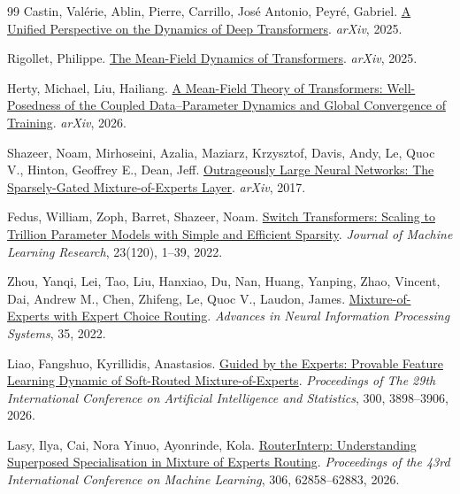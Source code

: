 \documentclass[11pt]{article}
\begin{document}
\begin{thebibliography}{99}
Castin, Val{\'e}rie, Ablin, Pierre, Carrillo, Jos{\'e} Antonio, Peyr{\'e}, Gabriel.
\newblock \href{https://arxiv.org/abs/2501.18322}{A Unified Perspective on the Dynamics of Deep Transformers}.
\newblock \emph{arXiv}, 2025.

Rigollet, Philippe.
\newblock \href{https://arxiv.org/abs/2512.01868}{The Mean-Field Dynamics of Transformers}.
\newblock \emph{arXiv}, 2025.

Herty, Michael, Liu, Hailiang.
\newblock \href{https://arxiv.org/abs/2608.25055}{A Mean-Field Theory of Transformers: Well-Posedness of the Coupled Data--Parameter Dynamics and Global Convergence of Training}.
\newblock \emph{arXiv}, 2026.

Shazeer, Noam, Mirhoseini, Azalia, Maziarz, Krzysztof, Davis, Andy, Le, Quoc V., Hinton, Geoffrey E., Dean, Jeff.
\newblock \href{https://arxiv.org/abs/1701.06538}{Outrageously Large Neural Networks: The Sparsely-Gated Mixture-of-Experts Layer}.
\newblock \emph{arXiv}, 2017.

Fedus, William, Zoph, Barret, Shazeer, Noam.
\newblock \href{https://www.jmlr.org/papers/v23/21-0998.html}{Switch Transformers: Scaling to Trillion Parameter Models with Simple and Efficient Sparsity}.
\newblock \emph{Journal of Machine Learning Research}, 23(120), 1--39, 2022.

Zhou, Yanqi, Lei, Tao, Liu, Hanxiao, Du, Nan, Huang, Yanping, Zhao, Vincent, Dai, Andrew M., Chen, Zhifeng, Le, Quoc V., Laudon, James.
\newblock \href{https://arxiv.org/abs/2202.09368}{Mixture-of-Experts with Expert Choice Routing}.
\newblock \emph{Advances in Neural Information Processing Systems}, 35, 2022.

Liao, Fangshuo, Kyrillidis, Anastasios.
\newblock \href{https://proceedings.mlr.press/v300/liao26a.html}{Guided by the Experts: Provable Feature Learning Dynamic of Soft-Routed Mixture-of-Experts}.
\newblock \emph{Proceedings of The 29th International Conference on Artificial Intelligence and Statistics}, 300, 3898--3906, 2026.

Lasy, Ilya, Cai, Nora Yinuo, Ayonrinde, Kola.
\newblock \href{https://proceedings.mlr.press/v306/lasy26a.html}{RouterInterp: Understanding Superposed Specialisation in Mixture of Experts Routing}.
\newblock \emph{Proceedings of the 43rd International Conference on Machine Learning}, 306, 62858--62883, 2026.


\end{thebibliography}
\end{document}
